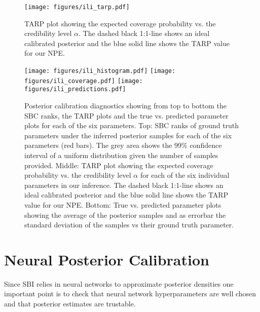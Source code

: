 \documentclass{aa}
\begin{document}
\begin{appendix}
\begin{figure}[]
     \centering
     \texttt{[image: figures/ili\_tarp.pdf]}
     \caption{TARP plot showing the expected coverage probability vs. the credibility level $\alpha$. The dashed black 1:1-line shows an ideal calibrated posterior and the blue solid line shows the TARP value for our NPE.}
     \label{fig:tarp}
\end{figure}

\begin{figure*}[]
     \centering
     \texttt{[image: figures/ili\_histogram.pdf]}
     \texttt{[image: figures/ili\_coverage.pdf]}
     \texttt{[image: figures/ili\_predictions.pdf]}
     \caption{Posterior calibration diagnostics showing from top to bottom the SBC ranks, the TARP plots and the true vs. predicted parameter plots for each of the six parameters.
     Top: SBC ranks of ground truth parameters under the inferred posterior samples for each of the six parameters (red bars). The grey area shows the 99\% confidence interval of a uniform distribution given the number of samples provided. Middle: TARP plot showing the expected coverage probability vs. the credibility level $\alpha$ for each of the six individual parameters in our inference. The dashed black 1:1-line shows an ideal calibrated posterior and the blue solid line shows the TARP value for our NPE. Bottom: True vs. predicted parameter plots showing the average of the posterior samples and as errorbar the standard deviation of the samples vs their ground truth parameter.}
     \label{fig:tarp}
\end{figure*}

\section{Neural Posterior Calibration}
\label{sec:sbc}

Since SBI relies in neural networks to approximate posterior densities one important point is to check that neural network hyperparameters are well chosen and that posterior estimates are trustable.


\end{appendix}
\end{document}
